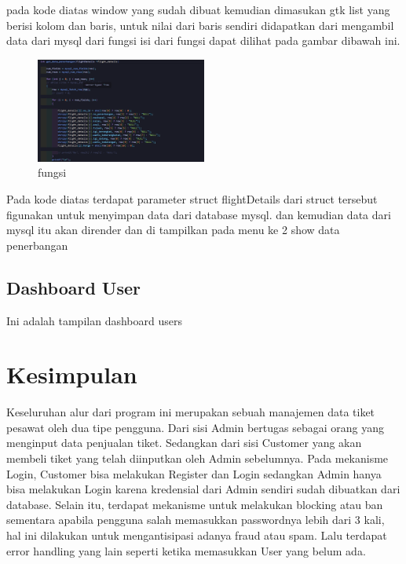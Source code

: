 \documentclass[a4paper,12pt]{article}
\begin{document}
\FloatBarrier
pada kode diatas window yang sudah dibuat kemudian dimasukan gtk list yang berisi kolom dan baris, untuk nilai dari baris sendiri didapatkan dari mengambil data dari mysql dari fungsi \texttt{} 
isi dari fungsi \texttt{} dapat dilihat pada gambar dibawah ini.
\begin{figure}[!htbp]
    \centering
    \includegraphics[width=0.5\textwidth]{./img/dashboard_admin/get_penerbangan.png}
    \caption{fungsi \texttt{}}
\end{figure}
\FloatBarrier
Pada kode diatas terdapat parameter struct flightDetails dari struct tersebut figunakan untuk menyimpan data dari database mysql.
dan kemudian data dari mysql itu akan dirender dan di tampilkan pada menu ke 2 show data penerbangan
\subsection{Dashboard User}
Ini adalah tampilan dashboard users
\section{Kesimpulan}
Keseluruhan alur dari program ini merupakan sebuah manajemen data tiket pesawat oleh dua tipe pengguna.
Dari sisi Admin bertugas sebagai orang yang menginput data penjualan tiket. Sedangkan dari sisi Customer yang akan membeli tiket yang telah diinputkan oleh Admin sebelumnya.
Pada mekanisme Login, Customer bisa melakukan Register dan Login sedangkan Admin hanya bisa melakukan Login karena kredensial dari Admin sendiri sudah dibuatkan dari database. Selain itu, terdapat mekanisme untuk melakukan blocking atau ban
sementara apabila pengguna salah memasukkan passwordnya lebih dari 3 kali, hal ini dilakukan untuk mengantisipasi adanya fraud atau spam. Lalu terdapat error handling yang lain seperti ketika memasukkan User yang belum ada.
\end{document}
